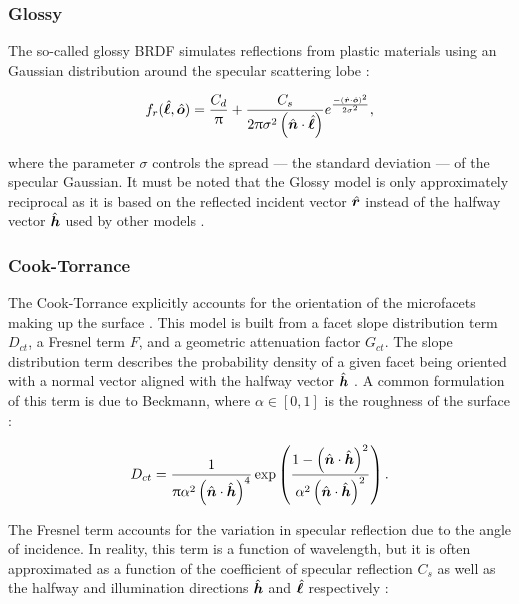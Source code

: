 \subsubsection{Glossy}

The so-called glossy BRDF simulates reflections from plastic materials using an Gaussian distribution around the specular scattering lobe \cite{duvenhage2013}:

\begin{equation} \label{eq:brdf_glossy}
  f_r(\hat{\bm{\ell}}, \hat{\bm{o}}) = \frac{C_d}{\uppi} + \frac{C_s}{2\uppi \sigma^2 \left(\hat{\bm{n}} \cdot \hat{\bm{\ell}}\right)}  e^{\frac{-\left( \hat{\bm{r}} \cdot \hat{\bm{o}} \right)^2}{2\sigma^2}},
\end{equation}

where the parameter $\sigma$ controls the spread --- the standard deviation --- of the specular Gaussian. It must be noted that the Glossy model is only approximately reciprocal as it is based on the reflected incident vector $\hat{\bm{r}}$ instead of the halfway vector $\hat{\bm{h}}$ used by other models \cite{duvenhage2013}.

\subsubsection{Cook-Torrance}

The Cook-Torrance explicitly accounts for the orientation of the microfacets making up the surface \cite{cook1982}. This model is built from a facet slope distribution term $D_{ct}$, a Fresnel term $F$, and a geometric attenuation factor $G_{ct}$. The slope distribution term describes the probability density of a given facet being oriented with a normal vector aligned with the halfway vector $\hat{\bm{h}}$ \cite{cook1982}. A common formulation of this term is due to Beckmann, where $\alpha \in [0, 1]$ is the roughness of the surface \cite{cook1982}:

\begin{equation} \label{eq:d_beckmann}
  D_{ct} = \frac{1}{\uppi \alpha^2 \left( \hat{\bm{n}} \cdot \hat{\bm{h}} \right)^4} \exp\left( \frac{1 - \left(\hat{\bm{n}} \cdot \hat{\bm{h}}\right)^2}{\alpha^2 \left( \hat{\bm{n}} \cdot \hat{\bm{h}} \right)^2} \right).
\end{equation}

The Fresnel term accounts for the variation in specular reflection due to the angle of incidence. In reality, this term is a function of wavelength, but it is often approximated as a function of the coefficient of specular reflection $C_s$ as well as the halfway and illumination directions $\hat{\bm{h}}$ and $\hat{\bm{\ell}}$ respectively \cite{cook1982}:

